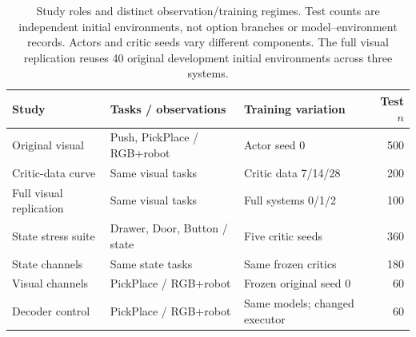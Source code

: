 \begin{table}[tb]\centering\small
\caption{Study roles and distinct observation/training regimes. Test counts are independent initial environments, not option branches or model--environment records. Actors and critic seeds vary different components. The full visual replication reuses 40 original development initial environments across three systems.}\label{tab:studies}
\setlength{\tabcolsep}{3pt}
\begin{tabular}{p{3.1cm}p{3.5cm}p{2.9cm}r}\toprule Study & Tasks / observations & Training variation & Test $n$\\\midrule
Original visual & Push, PickPlace / RGB+robot & Actor seed 0 & 500\\
Critic-data curve & Same visual tasks & Critic data 7/14/28 & 200\\
Full visual replication & Same visual tasks & Full systems 0/1/2 & 100\\
State stress suite & Drawer, Door, Button / state & Five critic seeds & 360\\
State channels & Same state tasks & Same frozen critics & 180\\
Visual channels & PickPlace / RGB+robot & Frozen original seed 0 & 60\\
Decoder control & PickPlace / RGB+robot & Same models; changed executor & 60\\\bottomrule
\end{tabular}
\end{table}
